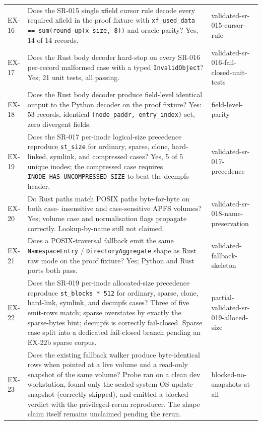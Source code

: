 \begin{longtable}{p{}p{}p{}}
EX-16 &
Does the SR-015 single xfield cursor rule decode every required
xfield in the proof fixture with
\texttt{xf\_used\_data == sum(round\_up(x\_size, 8))} and oracle
parity? Yes, 14 of 14 records.
& validated-sr-015-cursor-rule \\

EX-17 &
Does the Rust body decoder hard-stop on every SR-016 per-record
malformed case with a typed \texttt{InvalidObject}? Yes; 21 unit
tests, all passing.
& validated-sr-016-fail-closed-unit-tests \\

EX-18 &
Does the Rust body decoder produce field-level identical output to
the Python decoder on the proof fixture? Yes: 53 records, identical
\texttt{(node\_paddr, entry\_index)} set, zero divergent fields.
& field-level-parity \\

EX-19 &
Does the SR-017 per-inode logical-size precedence reproduce
\texttt{st\_size} for ordinary, sparse, clone, hard-linked, symlink,
and compressed cases? Yes, 5 of 5 unique inodes; the compressed case
requires \texttt{INODE\_HAS\_UNCOMPRESSED\_SIZE} to beat the decmpfs
header.
& validated-sr-017-precedence \\

EX-20 &
Do Rust paths match POSIX paths byte-for-byte on both case-
insensitive and case-sensitive APFS volumes? Yes; volume case and
normalisation flags propagate correctly. Lookup-by-name still not
claimed.
& validated-sr-018-name-preservation \\

EX-21 &
Does a POSIX-traversal fallback emit the same
\texttt{NamespaceEntry} / \texttt{DirectoryAggregate} shape as Rust
raw mode on the proof fixture? Yes; Python and Rust ports both pass.
& validated-fallback-skeleton \\

EX-22 &
Does the SR-019 per-inode allocated-size precedence reproduce
\texttt{st\_blocks * 512} for ordinary, sparse, clone, hard-link,
symlink, and decmpfs cases? Three of five emit-rows match; sparse
overstates by exactly the sparse-bytes hint; decmpfs is correctly
fail-closed. Sparse case split into a dedicated fail-closed branch
pending an EX-22b sparse corpus.
& partial-validated-sr-019-alloced-size \\

EX-23 &
Does the existing fallback walker produce byte-identical rows when
pointed at a live volume and a read-only snapshot of the same
volume? Probe ran on a clean dev workstation, found only the
sealed-system OS-update snapshot (correctly skipped), and emitted
a blocked verdict with the privileged-rerun reproducer. The shape
claim itself remains unclaimed pending the rerun.
& blocked-no-snapshots-at-all \\


\end{longtable}
